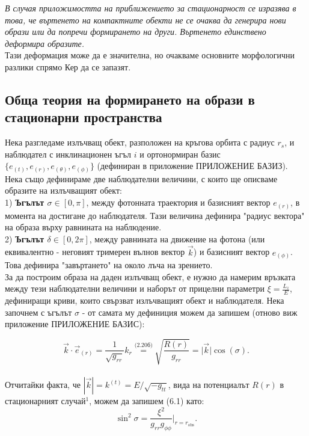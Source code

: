 \emph{В случая приложимостта на приближението за стационарност се изразява в това, че въртенето на компактните обекти не се очаква да генерира нови образи или да попречи формирането на други. Въртенето единствено деформира образите.}\\

Тази деформация може да е значителна, но очакваме основните морфологични разлики спрямо Кер да се запазят.

\subsection{Обща теория на формирането на образи в стационарни пространства}

Нека разгледаме излъчващ обект, разположен на кръгова орбита с радиус $r_s$, и наблюдател с инклинационен ъгъл $i$ и ортонормиран базис $\{e_{(t)}, e_{(r)}, e_{(\theta)}, e_{(\phi)}\}$ (дефиниран в приложение ПРИЛОЖЕНИЕ БАЗИЗ). Нека също дефинираме две наблюдателни величини, с които ще описваме образите на излъчващият обект:\\

1) \textbf{Ъгълът $\sigma\in[0,\pi]$}, между фотонната траектория и базисният вектор $e_{(r)}$, в момента на достигане до наблюдателя. Тази величина дефинира "радиус вектора" на образа върху равнината на наблюдение.\\

2) \textbf{Ъгълът $\delta\in[0,2\pi]$}, между равнината на движение на фотона (или еквивалентно - неговият тримерен вълнов вектор $\vec{k}$) и базисният вектор $e_{(\phi)}$. Това дефинира "завъртането" на около лъча на зрението.\\

За да построим образа на даден излъчващ обект, е нужно да намерим връзката между тези наблюдателни величини и наборът от прицелни параметри $\xi = \frac{L_z}{E}$, дефиниращи криви, които свързват излъчващият обект и наблюдателя. Нека започнем с ъгълът $\sigma$ - от самата му дефиниция можем да запишем (отново виж приложение ПРИЛОЖЕНИЕ БАЗИС):

\begin{equation}
	\vec{k} \cdot \vec{e}_{(r)} = \frac{1}{\sqrt{g_{rr}}}k_{r} \stackrel{\text{(2.20б)}}{=} \sqrt{\frac{R(r)}{g_{rr}}} =  \big\vert \vec{k}\big\vert \cos(\sigma).
\end{equation}\\
Отчитайки факта, че $|\vec{k}| = k^{(t)} = E/\sqrt{-g_{tt}}$,  вида на потенциалът $R(r)$ в стационарният случай$^1$, можем да запишем (6.1) като:
\begin{equation}
	\sin^2\sigma = \frac{\xi^2}{g_{rr}g_{\phi\phi}}\bigg\vert_{r = r_\text{obs}}.
\end{equation}

